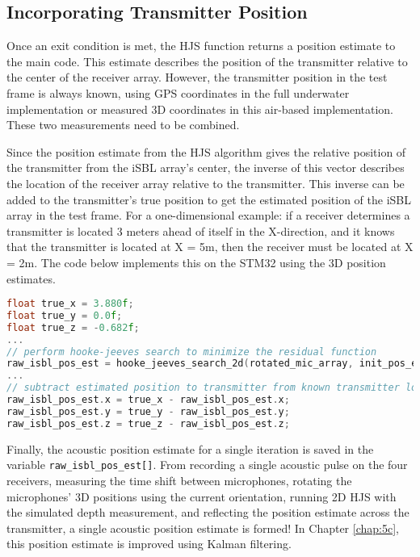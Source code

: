\documentclass[11pt]{ucthesisCP}
\begin{document}
\subsection{Incorporating Transmitter Position} \label{ssec:3s9s3}
Once an exit condition is met, the HJS function returns a position estimate to the main code. This estimate describes the position of the transmitter relative to the center of the receiver array. However, the transmitter position in the test frame is always known, using GPS coordinates in the full underwater implementation or measured 3D coordinates in this air-based implementation. These two measurements need to be combined.

Since the position estimate from the HJS algorithm gives the relative position of the transmitter from the iSBL array’s center, the inverse of this vector describes the location of the receiver array relative to the transmitter. This inverse can be added to the transmitter’s true position to get the estimated position of the iSBL array in the test frame. For a one-dimensional example: if a receiver determines a transmitter is located 3 meters ahead of itself in the X-direction, and it knows that the transmitter is located at X = 5m, then the receiver must be located at X = 2m. The code below implements this on the STM32 using the 3D position estimates.

\begin{lstlisting}[language=C++]
float true_x = 3.880f;
float true_y = 0.0f;
float true_z = -0.682f;
...
// perform hooke-jeeves search to minimize the residual function
raw_isbl_pos_est = hooke_jeeves_search_2d(rotated_mic_array, init_pos_est, measured_time_shifts, 1000, 1e-13, 1e-6, 2.0f);
...
// subtract estimated position to transmitter from known transmitter location to get receiver position
raw_isbl_pos_est.x = true_x - raw_isbl_pos_est.x;
raw_isbl_pos_est.y = true_y - raw_isbl_pos_est.y;
raw_isbl_pos_est.z = true_z - raw_isbl_pos_est.z;
\end{lstlisting}

Finally, the acoustic position estimate for a single iteration is saved in the variable \verb|raw_isbl_pos_est[]|. From recording a single acoustic pulse on the four receivers, measuring the time shift between microphones, rotating the microphones’ 3D positions using the current orientation, running 2D HJS with the simulated depth measurement, and reflecting the position estimate across the transmitter, a single acoustic position estimate is formed! In Chapter \ref{chap:5c}, this position estimate is improved using Kalman filtering.
\end{document}

